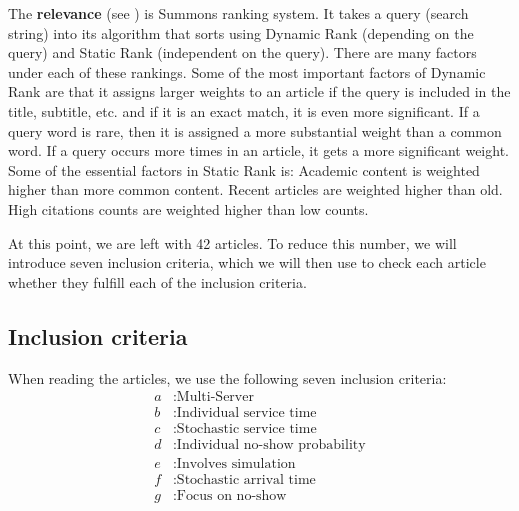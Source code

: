 \documentclass[a4paper,12pt]{article}
\begin{document}
The \textbf{relevance} (see \cite{relevance}) is Summons ranking system.  It takes a query (search string) into its algorithm that sorts using Dynamic Rank (depending on the query) and Static Rank (independent on the query). There are many factors under each of these rankings. Some of the most important factors of Dynamic Rank are that it assigns larger weights to an article if the query is included in the title, subtitle, etc. and if it is an exact match, it is even more significant. If a query word is rare, then it is assigned a more substantial weight than a common word. If a query occurs more times in an article, it gets a more significant weight. Some of the essential factors in Static Rank is: Academic content is weighted higher than more common content. Recent articles are weighted higher than old. High citations counts are weighted higher than low counts.

\bigbreak


At this point, we are left with 42 articles. To reduce this number, we will introduce seven inclusion criteria, which we will then use to check each article whether they fulfill each of the inclusion criteria.


\subsection{Inclusion criteria}
When reading the articles, we use the following seven inclusion criteria:
\begin{align*}
    a &: \text{Multi-Server} \\
b &: \text{Individual service time} \\
c &: \text{Stochastic service time} \\
d &: \text{Individual no-show probability} \\
e &: \text{Involves simulation} \\
f &: \text{Stochastic arrival time} \\
g &: \text{Focus on no-show} 
\end{align*}
\end{document}
